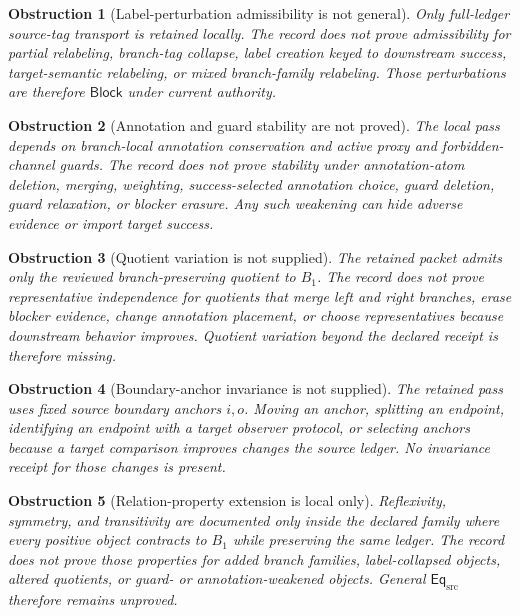 \documentclass[11pt]{article}
\newcommand{\EqSrc}{\mathsf{Eq}_{\mathrm{src}}}
\newcommand{\Block}{\mathsf{Block}}
\newtheorem{obstruction}{Obstruction}
\begin{document}
\begin{obstruction}[Label-perturbation admissibility is not general]
Only full-ledger source-tag transport is retained locally. The record
does not prove admissibility for partial relabeling, branch-tag collapse,
label creation keyed to downstream success, target-semantic relabeling,
or mixed branch-family relabeling. Those perturbations are therefore
\(\Block\) under current authority.
\end{obstruction}

\begin{obstruction}[Annotation and guard stability are not proved]
The local pass depends on branch-local annotation conservation and active
proxy and forbidden-channel guards. The record does not prove stability
under annotation-atom deletion, merging, weighting, success-selected
annotation choice, guard deletion, guard relaxation, or blocker erasure.
Any such weakening can hide adverse evidence or import target success.
\end{obstruction}

\begin{obstruction}[Quotient variation is not supplied]
The retained packet admits only the reviewed branch-preserving quotient to
\(B_{1}\). The record does not prove representative independence for
quotients that merge left and right branches, erase blocker evidence,
change annotation placement, or choose representatives because downstream
behavior improves. Quotient variation beyond the declared receipt is
therefore missing.
\end{obstruction}

\begin{obstruction}[Boundary-anchor invariance is not supplied]
The retained pass uses fixed source boundary anchors \(i,o\). Moving an
anchor, splitting an endpoint, identifying an endpoint with a target
observer protocol, or selecting anchors because a target comparison
improves changes the source ledger. No invariance receipt for those
changes is present.
\end{obstruction}

\begin{obstruction}[Relation-property extension is local only]
Reflexivity, symmetry, and transitivity are documented only inside the
declared family where every positive object contracts to \(B_{1}\) while
preserving the same ledger. The record does not prove those properties
for added branch families, label-collapsed objects, altered quotients, or
guard- or annotation-weakened objects. General \(\EqSrc\) therefore
remains unproved.
\end{obstruction}
\end{document}

